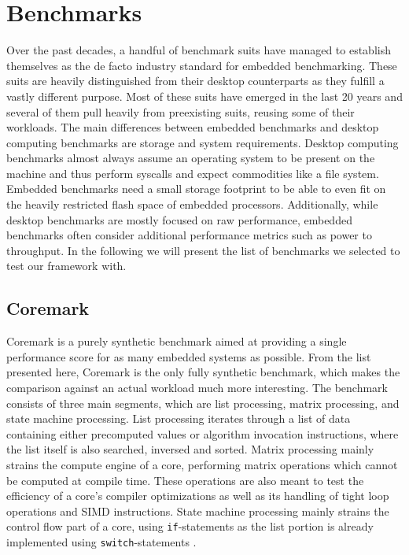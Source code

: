 \documentclass[../bachelor_paper.tex]{subfiles}
\begin{document}
\chapter{Benchmarks}
    \label{ch:bench}

Over the past decades, a handful of benchmark suits have managed to establish themselves as the de facto industry standard for embedded benchmarking. These suits are heavily distinguished from their desktop counterparts as they fulfill a vastly different purpose. Most of these suits have emerged in the last 20 years and several of them pull heavily from preexisting suits, reusing some of their workloads. The main differences between embedded benchmarks and desktop computing benchmarks are storage and system requirements. Desktop computing benchmarks almost always assume an operating system to be present on the machine and thus perform syscalls and expect commodities like a file system. Embedded benchmarks need a small storage footprint to be able to even fit on the heavily restricted flash space of embedded processors. Additionally, while desktop benchmarks are mostly focused on raw performance, embedded benchmarks often consider additional performance metrics such as power to throughput. In the following we will present the list of benchmarks we selected to test our framework with.

\section{Coremark}
Coremark is a purely synthetic benchmark aimed at providing a single performance score for as many embedded systems as possible. From the list presented here, Coremark is the only fully synthetic benchmark, which makes the comparison against an actual workload much more interesting. The benchmark consists of three main segments, which are list processing, matrix processing, and state machine processing. List processing iterates through a list of data containing either precomputed values or algorithm invocation instructions, where the list itself is also searched, inversed and sorted. Matrix processing mainly strains the compute engine of a core, performing matrix operations which cannot be computed at compile time. These operations are also meant to test the efficiency of a core's compiler optimizations as well as its handling of tight loop operations and \ac{SIMD} instructions. State machine processing mainly strains the control flow part of a core, using \texttt{if}-statements as the list portion is already implemented using \texttt{switch}-statements \cite{gal-onExploringCoremarkBenchmark2012}.
\end{document}

